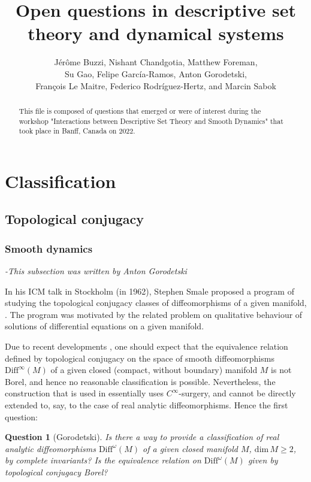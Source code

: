 \documentclass{article}
\title{Open questions in descriptive set theory and dynamical systems}
\author{Jérôme Buzzi, Nishant Chandgotia, Matthew Foreman,\\
Su Gao, Felipe García-Ramos, Anton Gorodetski,\\ François Le Maitre, Federico Rodríguez-Hertz, and Marcin Sabok}
\date{}
\newtheorem{question}[theorem]{Question}
\theoremstyle{definition}
\begin{document}
\maketitle
\begin{abstract}
  This file is composed of questions that emerged or were of interest during the workshop "Interactions between Descriptive Set Theory and Smooth Dynamics" that took place in Banff, Canada on 2022. 
\end{abstract}
\tableofcontents


\section{Classification}
\subsection{Topological conjugacy}
\subsubsection{Smooth dynamics}
\textit{-This subsection was written by Anton Gorodetski}

In his ICM talk in Stockholm (in 1962), Stephen Smale proposed a program of studying the topological conjugacy
classes of diffeomorphisms of a given manifold, \cite{S63ICM}. The program was motivated by the related problem on qualitative behaviour of solutions of differential equations on a given manifold.



Due to recent developments \cite{FG}, one should expect that the equivalence relation defined by topological conjugacy on the space of smooth diffeomorphisms $\text{Diff}^{\infty}(M)$ of a given closed (compact, without boundary) manifold $M$ is not Borel, and hence no reasonable classification is possible. Nevertheless, the construction that is used in \cite{FG} essentially uses $C^\infty$-surgery, and cannot be directly extended to, say, to the case of real analytic diffeomorphisms. Hence the first question:

\vspace{5pt}

\begin{question} [Gorodetski] Is there a way to provide a classification of real analytic diffeomorphisms $\text{Diff}^{\omega}(M)$ of a given closed manifold $M$, $\text{dim}\,M\ge 2$, by complete invariants? Is the equivalence relation on $\text{Diff}^{\omega}(M)$ given by topological conjugacy Borel?
\end{question}
\vspace{5pt}
\end{document}
